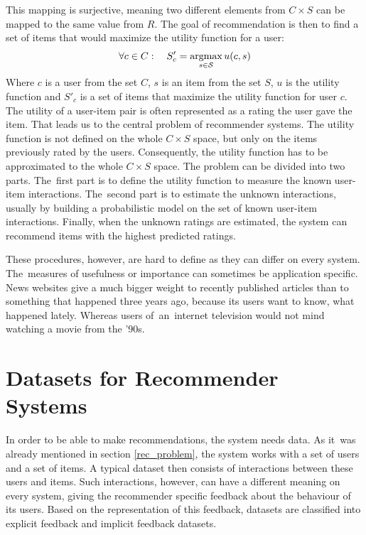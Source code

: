 This mapping is surjective, meaning two different elements from $C \times S$ can be mapped to the same value from $R$. The goal of recommendation is then to find a set of items that would maximize the utility function for a user: 
\begin{equation}
    \forall c \in C: \quad S'_{c} = \operatorname*{argmax}_{s \in \mathcal{S}} u(c, s)
\end{equation}
Where $c$ is a user from the set $C$, $s$ is an item from the set $S$, $u$ is the utility function and $S'_{c}$ is a set of items that maximize the utility function for user $c$.
The utility of a user-item pair is often represented as a rating the user gave the item. That leads us to the central problem of recommender systems. The utility function is not defined on the whole $C \times S$ space, but only on the items previously rated by the users. Consequently, the utility function has to be approximated to the whole $C \times S$ space. 
The problem can be divided into two parts. The~first part is to define the utility function to measure the known user-item interactions. The~second part is to estimate the unknown interactions, usually by building a probabilistic model on the set of known user-item interactions. Finally, when the unknown ratings are estimated, the system can recommend items with the highest predicted ratings.

These procedures, however, are hard to define as they can differ on every system. The~measures of usefulness or importance can sometimes be application specific. \\ News websites give a much bigger weight to recently published articles than to something that happened three years ago, because its users want to know, what happened lately. Whereas users of~an~internet television would not mind watching a movie from the ’90s. 


\chapter{Datasets for Recommender Systems} \label{datasets}

In order to be able to make recommendations, the system needs data. As it~was already mentioned in section \ref{rec_problem}, the system works with a set of users and a set of items. A typical dataset then consists of interactions between these users and items. Such interactions, however, can have a different meaning on every system, giving the recommender specific feedback about the behaviour of its users. Based on the representation of this feedback, datasets are classified into explicit feedback and implicit feedback datasets. 

